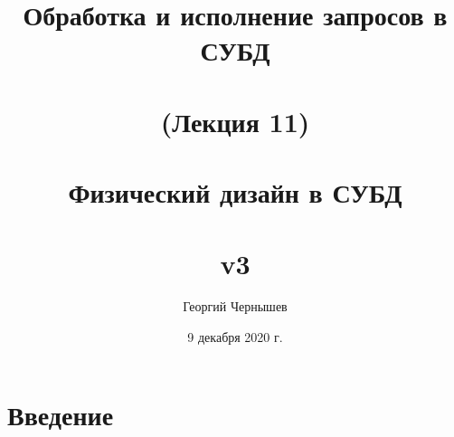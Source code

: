 \documentclass[unicode]{beamer}
\title[Обработка и исполнение запросов: лекция 11]{Обработка и исполнение запросов в СУБД \\~\\ (Лекция 11) \\~\\ Физический дизайн в СУБД\\~\\ v3} %
\author{Георгий Чернышев} %
\institute[ВШЭ] %
{
Высшая Школа Экономики \\ %
\medskip
\textit{chernishev@gmail.com} %
}
\date{9 декабря 2020 г.} %
\begin{document}
\begin{frame}
\titlepage %
\end{frame}

\section{Введение}

\end{document}

